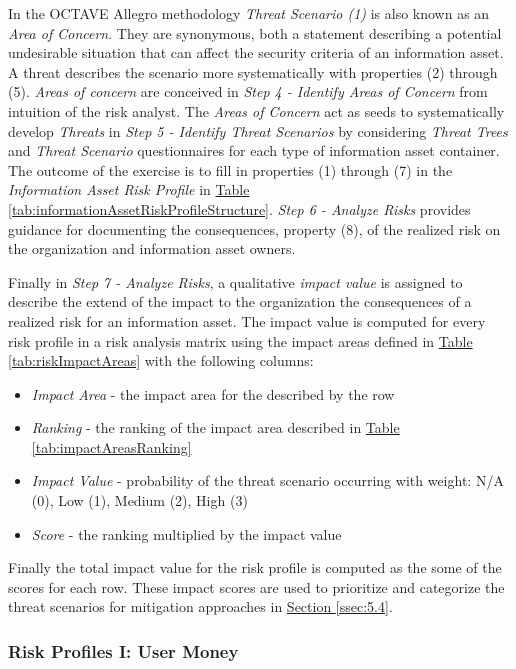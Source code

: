 \documentclass[a4paper,12pt]{article} %
\newcommand{\hypertableref}[1]{\hyperref[#1]{Table \ref{#1}}}
\newcommand{\hypersectionref}[1]{\hyperref[#1]{Section \ref{#1}}}
\begin{document}
{In the OCTAVE Allegro methodology \textit{Threat Scenario (1)} is also known as an \textit{Area of Concern}. They are synonymous, both a statement describing a potential undesirable situation that can affect the security criteria of an information asset. A threat describes the scenario more systematically with properties (2) through (5). \textit{Areas of concern} are conceived in \textit{Step 4 - Identify Areas of Concern} from intuition of the risk analyst. The \textit{Areas of Concern} act as seeds to systematically develop \textit{Threats} in \textit{Step 5 - Identify Threat Scenarios} by considering \textit{Threat Trees} and \textit{Threat Scenario} questionnaires for each type of information asset container. The outcome of the exercise is to fill in properties (1) through (7) in the \textit{Information Asset Risk Profile} in \hypertableref{tab:informationAssetRiskProfileStructure}. \textit{Step 6 - Analyze Risks} provides guidance for documenting the consequences, property (8), of the realized risk on the organization and information asset owners.

Finally in \textit{Step 7 - Analyze Risks}, a qualitative \textit{impact value} is assigned to describe the extend of the impact to the organization the consequences of a realized risk for an information asset. The impact value is computed for every risk profile in a risk analysis matrix using the impact areas defined in \hypertableref{tab:riskImpactAreas} with the following columns:

\begin{itemize}
	\item \textit{Impact Area} - the impact area for the described by the row
	\item \textit{Ranking} - the ranking of the impact area described in \hypertableref{tab:impactAreasRanking}
	\item \textit{Impact Value} - probability of the threat scenario occurring with weight: N/A (0), Low (1), Medium (2), High (3)
	\item \textit{Score} - the ranking multiplied by the impact value
\end{itemize}

Finally the total impact value for the risk profile is computed as the some of the scores for each row. These impact scores are used to prioritize and categorize the threat scenarios for mitigation approaches in \hypersectionref{ssec:5.4}.

\subsubsection{Risk Profiles I: User Money} \label{sssec:5.3:userMoneyRiskProfiles}

}
\end{document}
